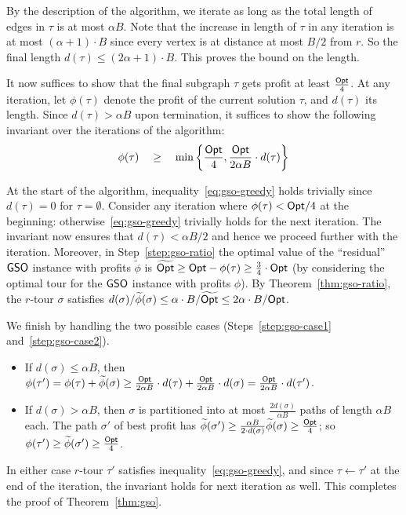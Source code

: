 \documentclass[11pt]{article}
\def\opt{{\sf Opt}\xspace}
\newcommand{\profit}{\phi}
\def\gso{\ensuremath{{\sf GSO}}\xspace}
\begin{document}
  By the description of the algorithm, we iterate as long
  as the total length of edges in $\tau$ is at most  $\alpha B$. Note that the increase in length of $\tau$ in any iteration is at most
  $(\alpha+1)\cdot B$ since every vertex is at distance at
  most $B/2$ from $r$. So the final length $d(\tau)\le (2\alpha
  +1)\cdot B$. This proves
  the bound on the length. 
  
  It now
  suffices to show that the final subgraph $\tau$ gets profit at least
  $\frac\opt{4}$. At any iteration, let $\profit(\tau)$ denote the
  profit of the current solution $\tau$, and $d(\tau)$ its length. Since $d(\tau)>\alpha B$ upon
  termination, it suffices to show the following invariant 
  over the iterations of the algorithm:
  \begin{equation}
    \label{eq:gso-greedy}
    \profit(\tau) \quad \ge  \quad \min\left\{ \frac{\opt}4, \frac{\opt}{2\alpha B}\cdot
      d(\tau)\right\}
  \end{equation}

At the start of the algorithm, inequality~\eqref{eq:gso-greedy} holds trivially
  since $d(\tau) = 0$ for $\tau=\emptyset$. Consider any iteration where
  $\profit(\tau)<\opt/4$ at the beginning: otherwise~\eqref{eq:gso-greedy} trivially holds for the next iteration. The
  invariant now ensures that $d(\tau) < \alpha B/2$ and hence we proceed
  further with the iteration. Moreover, in Step~\ref{step:gso-ratio} the optimal value
  of the ``residual'' \gso instance with profits $\widetilde \profit$ is $\widetilde\opt \ge \opt - \profit(\tau) \ge \frac34\cdot \opt$ (by considering the optimal tour for the \gso instance with profits $\profit$). By Theorem~\ref{thm:gso-ratio}, the $r$-tour $\sigma$ satisfies $d(\sigma)/\widetilde\profit(\sigma) \le \alpha\cdot B/\widetilde\opt\le 2\alpha\cdot B/\opt$.
  

We finish by handling the two possible cases
(Steps~\ref{step:gso-case1} and~\ref{step:gso-case2}).
  \begin{itemize}
  \item If $d(\sigma)\le \alpha B$, then $\profit(\tau')=\profit(\tau)+\widetilde\profit(\sigma)\ge \frac{\opt}{2\alpha B}\cdot d(\tau) + \frac{\opt}{2\alpha B}\cdot d(\sigma)=\frac{\opt}{2\alpha B}\cdot d(\tau')$.
  \item If $d(\sigma)> \alpha B$, then $\sigma$ is partitioned into at most $\frac{2d(\sigma)}{\alpha B}$ paths of length $\alpha  B$ each. The path $\sigma'$ of best profit has $\widetilde\profit(\sigma')\ge \frac{\alpha B}{2\cdot d(\sigma)} \widetilde\profit(\sigma)\ge \frac{\opt}4$; so $\profit(\tau')\ge\widetilde\profit(\sigma')\ge  \frac\opt{4}$.
  \end{itemize}
In either case $r$-tour $\tau'$ satisfies  inequality~\eqref{eq:gso-greedy}, and since $\tau \gets \tau'$ at the end of  the
iteration, the invariant holds for next iteration as well. This completes the proof of Theorem~\ref{thm:gso}.
\end{document}
